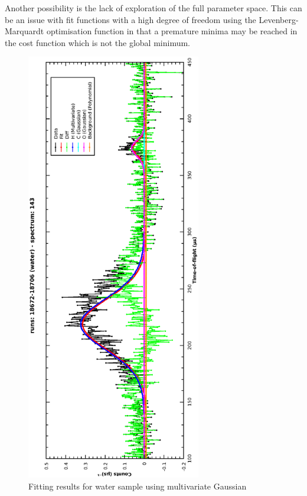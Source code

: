 \documentclass[a4paper]{article}
\begin{document}
Another possibility is the lack of exploration of the full parameter space. This
can be an issue with fit functions with a high degree of freedom using the
Levenberg-Marquardt optimisation function in that a premature minima may be
reached in the cost function which is not the global minimum.

\begin{figure}[h!]
  \centering
  \vspace{-60pt}
  \begin{turn}{-90}
    \includegraphics[width=0.68\textwidth]{graphics/cs_water_mvg.eps}
  \end{turn}
  \vspace{-60pt}
  \caption{Fitting results for water sample using multivariate Gaussian}
  \label{fig:mvg_water_fit}
\end{figure}
\FloatBarrier
\end{document}
